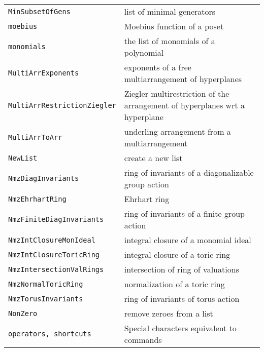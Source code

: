 \documentclass[a4paper]{mybook}
\begin{document}
\begin{center}
\begin{longtable}{ll}
{\verb~MinSubsetOfGens~} &
      list of minimal generators\\
   
{\verb~moebius~} &
      Moebius function of a poset\\
   
{\verb~monomials~} &
      the list of monomials of a polynomial\\
   
{\verb~MultiArrExponents~} &
      exponents of a free multiarrangement of hyperplanes\\
   
{\verb~MultiArrRestrictionZiegler~} &
      Ziegler multirestriction of the arrangement of hyperplanes  wrt a hyperplane\\
   
{\verb~MultiArrToArr~} &
      underling arrangement from a multiarrangement\\
   
{\verb~NewList~} &
      create a new list\\
   
{\verb~NmzDiagInvariants~} &
      ring of invariants of a diagonalizable group action\\
   
{\verb~NmzEhrhartRing~} &
      Ehrhart ring\\
   
{\verb~NmzFiniteDiagInvariants~} &
      ring of invariants of a finite group action\\
   
{\verb~NmzIntClosureMonIdeal~} &
      integral closure of a monomial ideal\\
   
{\verb~NmzIntClosureToricRing~} &
      integral closure of a toric ring\\
   
{\verb~NmzIntersectionValRings~} &
      intersection of ring of valuations\\
   
{\verb~NmzNormalToricRing~} &
      normalization of a toric ring\\
   
{\verb~NmzTorusInvariants~} &
      ring of invariants of torus action\\
   
{\verb~NonZero~} &
      remove zeroes from a list\\
   
{\verb~operators, shortcuts~} &
      Special characters equivalent to commands\\
   

\end{longtable}
\end{center}
\end{document}
